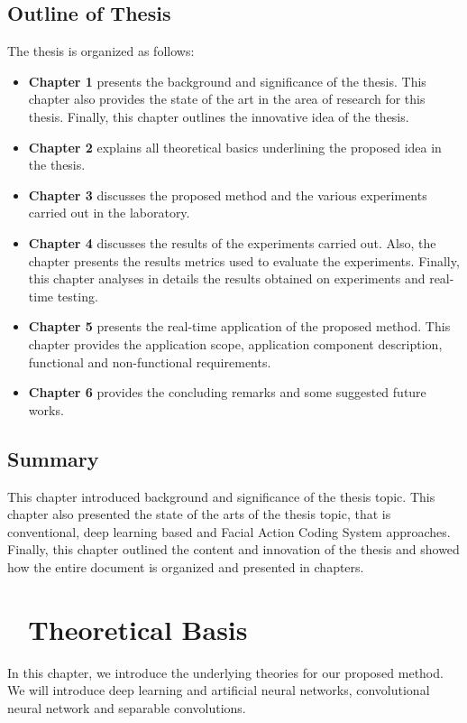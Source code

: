 \documentclass[master]{thesis-uestc}
\begin{document}
\section{Outline of Thesis}
The thesis is organized as follows:
\begin{itemize}
    \item \textbf{Chapter 1} presents the background and significance of the thesis. This chapter also provides the state of the art in the area of research for this thesis. Finally, this chapter outlines the innovative idea of the thesis.
    \item \textbf{Chapter 2} explains all theoretical basics underlining the proposed idea in the thesis.
    \item \textbf{Chapter 3} discusses the proposed method and the various experiments carried out in the laboratory.
    \item \textbf{Chapter 4} discusses the results of the experiments carried out. Also, the chapter presents the results metrics used to evaluate the experiments. Finally, this chapter analyses in details the results obtained on experiments and real-time testing.
    \item \textbf{Chapter 5} presents the real-time application of the proposed method. This chapter provides the application scope, application component description, functional and non-functional requirements. 
    \item \textbf{Chapter 6} provides the concluding remarks and some suggested future works.
\end{itemize}

\section{Summary}
This chapter introduced background and significance of the thesis topic. This chapter also presented the state of the arts of the thesis topic, that is conventional, deep learning based and Facial Action Coding System approaches. Finally, this chapter outlined the content and innovation of the thesis and showed how the entire document is organized and presented in chapters. 


\chapter{\,\,\,\,\,\textbf{Theoretical Basis}}
In this chapter, we introduce the underlying theories for our proposed method. We will introduce deep learning and artificial neural networks, convolutional neural network and separable convolutions.
\end{document}
